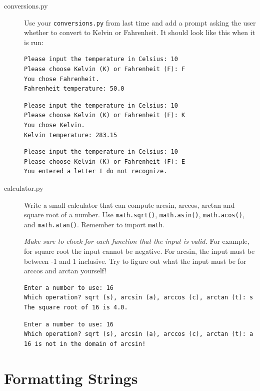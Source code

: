\documentclass[11pt]{cselabheader}
\begin{document}
\begin{description}
  \item[conversions.py] Use your \texttt{conversions.py} from last time and add a
    prompt asking the user whether to convert to Kelvin or Fahrenheit. It should
    look like this when it is run:

    \begin{lstlisting}[style=bash]
Please input the temperature in Celsius: 10
Please choose Kelvin (K) or Fahrenheit (F): F
You chose Fahrenheit.
Fahrenheit temperature: 50.0
    \end{lstlisting}
    \begin{lstlisting}[style=bash]
Please input the temperature in Celsius: 10
Please choose Kelvin (K) or Fahrenheit (F): K
You chose Kelvin.
Kelvin temperature: 283.15
    \end{lstlisting}
    \begin{lstlisting}[style=bash]
Please input the temperature in Celsius: 10
Please choose Kelvin (K) or Fahrenheit (F): E
You entered a letter I do not recognize.
    \end{lstlisting}

  \item[calculator.py] Write a small calculator that can compute arcsin, arccos,
    arctan and square root of a number. Use \lstinline!math.sqrt()!,
    \lstinline!math.asin()!, \lstinline!math.acos()!, and
    \lstinline!math.atan()!. Remember to import \lstinline!math!.

    \emph{Make sure to check for each function that the input is valid.} For
    example, for square root the input cannot be negative. For arcsin, the input
    must be between -1 and 1 inclusive. Try to figure out what the input must be
    for arccos and arctan yourself!

    \begin{lstlisting}[style=bash]
Enter a number to use: 16
Which operation? sqrt (s), arcsin (a), arccos (c), arctan (t): s
The square root of 16 is 4.0.
    \end{lstlisting}

    \begin{lstlisting}[style=bash]
Enter a number to use: 16
Which operation? sqrt (s), arcsin (a), arccos (c), arctan (t): a
16 is not in the domain of arcsin!
    \end{lstlisting}


\end{description}

\pagebreak
\section{Formatting Strings}
\end{document}
